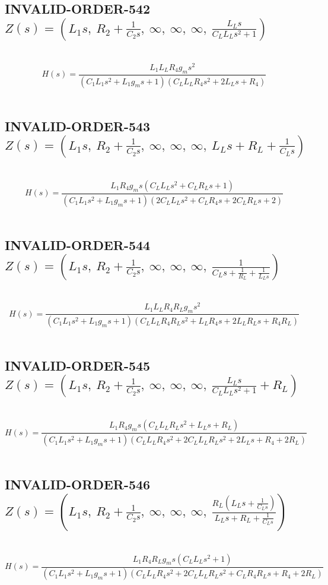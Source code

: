 \documentclass{article}
\begin{document}
\subsection{INVALID-ORDER-542 $Z(s) = \left( L_{1} s, \  R_{2} + \frac{1}{C_{2} s}, \  \infty, \  \infty, \  \infty, \  \frac{L_{L} s}{C_{L} L_{L} s^{2} + 1}\right)$ } \ 
\textbf{\[H(s) = \frac{L_{1} L_{L} R_{4} g_{m} s^{2}}{\left(C_{1} L_{1} s^{2} + L_{1} g_{m} s + 1\right) \left(C_{L} L_{L} R_{4} s^{2} + 2 L_{L} s + R_{4}\right)}\] } \ 
\subsection{INVALID-ORDER-543 $Z(s) = \left( L_{1} s, \  R_{2} + \frac{1}{C_{2} s}, \  \infty, \  \infty, \  \infty, \  L_{L} s + R_{L} + \frac{1}{C_{L} s}\right)$ } \ 
\textbf{\[H(s) = \frac{L_{1} R_{4} g_{m} s \left(C_{L} L_{L} s^{2} + C_{L} R_{L} s + 1\right)}{\left(C_{1} L_{1} s^{2} + L_{1} g_{m} s + 1\right) \left(2 C_{L} L_{L} s^{2} + C_{L} R_{4} s + 2 C_{L} R_{L} s + 2\right)}\] } \ 
\subsection{INVALID-ORDER-544 $Z(s) = \left( L_{1} s, \  R_{2} + \frac{1}{C_{2} s}, \  \infty, \  \infty, \  \infty, \  \frac{1}{C_{L} s + \frac{1}{R_{L}} + \frac{1}{L_{L} s}}\right)$ } \ 
\textbf{\[H(s) = \frac{L_{1} L_{L} R_{4} R_{L} g_{m} s^{2}}{\left(C_{1} L_{1} s^{2} + L_{1} g_{m} s + 1\right) \left(C_{L} L_{L} R_{4} R_{L} s^{2} + L_{L} R_{4} s + 2 L_{L} R_{L} s + R_{4} R_{L}\right)}\] } \ 
\subsection{INVALID-ORDER-545 $Z(s) = \left( L_{1} s, \  R_{2} + \frac{1}{C_{2} s}, \  \infty, \  \infty, \  \infty, \  \frac{L_{L} s}{C_{L} L_{L} s^{2} + 1} + R_{L}\right)$ } \ 
\textbf{\[H(s) = \frac{L_{1} R_{4} g_{m} s \left(C_{L} L_{L} R_{L} s^{2} + L_{L} s + R_{L}\right)}{\left(C_{1} L_{1} s^{2} + L_{1} g_{m} s + 1\right) \left(C_{L} L_{L} R_{4} s^{2} + 2 C_{L} L_{L} R_{L} s^{2} + 2 L_{L} s + R_{4} + 2 R_{L}\right)}\] } \ 
\subsection{INVALID-ORDER-546 $Z(s) = \left( L_{1} s, \  R_{2} + \frac{1}{C_{2} s}, \  \infty, \  \infty, \  \infty, \  \frac{R_{L} \left(L_{L} s + \frac{1}{C_{L} s}\right)}{L_{L} s + R_{L} + \frac{1}{C_{L} s}}\right)$ } \ 
\textbf{\[H(s) = \frac{L_{1} R_{4} R_{L} g_{m} s \left(C_{L} L_{L} s^{2} + 1\right)}{\left(C_{1} L_{1} s^{2} + L_{1} g_{m} s + 1\right) \left(C_{L} L_{L} R_{4} s^{2} + 2 C_{L} L_{L} R_{L} s^{2} + C_{L} R_{4} R_{L} s + R_{4} + 2 R_{L}\right)}\] } \ 
\end{document}
